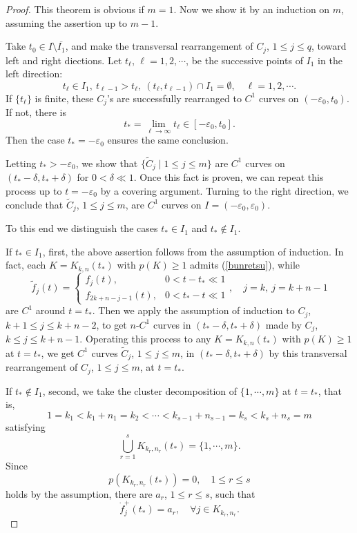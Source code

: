 \documentclass[final,a4paper]{jmsj}
\theoremstyle{thmstyleone}%
\theoremstyle{thmstyletwo}%
\theoremstyle{thmstylethree}%
\begin{document}
\begin{proof} 
This theorem is obvious if $m=1$. Now we show it by an induction on $m$, assuming the assertion up to $m-1$. 

Take $t_0\in I\setminus \overline{I_1}$, and make the transversal rearrangement of $C_j$, $1\leq j\leq q$, toward left and right diections.  Let $t_\ell$, $\ell=1,2,\cdots$, be the successive points of $I_1$ in the left direction: 
\[ t_\ell \in I_1, \ t_{\ell-1}>t_\ell, \ (t_\ell, t_{\ell-1})\cap I_1=\emptyset, \quad \ell=1,2,\cdots. \] 
If $\{ t_\ell \}$ is finite, these $C_j$'s are successfully rearranged to $C^1$ curves on $(-\varepsilon_0, t_0)$. If not, there is 
\[ t_\ast=\lim_{\ell\rightarrow \infty}t_\ell \in [-\varepsilon_0, t_0]. \] 
Then the case $t_\ast=-\varepsilon_0$ ensures the same conclusion. 

Letting $t_\ast>-\varepsilon_0$, we show that $\{ \tilde C_j\mid 1\leq j\leq m\}$ are $C^1$ curves on $(t_\ast-\delta, t_\ast+\delta)$ for $0<\delta \ll 1$.  Once this fact is proven, we can repeat this process up to $t=-\varepsilon_0$ by a covering argument. Turning to the right direction, we conclude that $\tilde C_j$, $1\leq j\leq m$, are $C^1$ curves on $I=(-\varepsilon_0, \varepsilon_0)$.  

To this end we distinguish the cases $t_\ast\in I_1$ and $t_\ast \not\in I_1$. 

If $t_\ast \in I_1$, first, the above  assertion follows from the assumption of induction. In fact, each $K=K_{k,n}(t_\ast)$ with $p(K)\geq 1$ admits (\ref{bunretsu}), while 
\[ \tilde f_j(t)=\left\{ \begin{array}{ll} 
f_j(t), & 0<t-t_\ast\ll 1\\ 
f_{2k+n-j-1}(t), & 0<t_\ast-t\ll 1\end{array} \right.,  \quad j=k, \ j=k+n-1 \] 
are $C^1$ around $t=t_\ast$. Then we apply the assumption of induction to $C_j$, $k+1\leq j\leq k+n-2$, to get $n$-$C^1$ curves in $(t_\ast-\delta, t_\ast+\delta)$ made by $C_j$, $k\leq j\leq k+n-1$. Operating this process to any $K=K_{k,n}(t_\ast)$ with $p(K)\geq 1$ at $t=t_\ast$, we get $C^1$ curves $\tilde C_j$, $1\leq j\leq m$, in $(t_\ast-\delta, t_\ast+\delta)$ by this transversal rearrangement of $C_j$, $1\leq j\leq m$, at $t=t_\ast$.  

If $t_\ast\not \in I_1$, second, we take the cluster decomposition of $\{ 1,\cdots, m\}$ at $t=t_\ast$, that is,  
\[ 1=k_1<k_1+n_1=k_2<\cdots< k_{s-1}+n_{s-1}=k_s<k_s+n_s=m \] 
satisfying  
\[ \bigcup_{r=1}^sK_{k_r, n_r}(t_\ast)=\{ 1, \cdots, m\}. \] 
Since 
\[ p(K_{k_r, n_r}(t_\ast))=0, \quad 1\leq r\leq s \] 
holds by the assumption, there are $a_r$, $1\leq r\leq s$, such that 
\[ \dot f_j^+(t_\ast)=a_r, \quad \forall j\in K_{k_r, n_r}. \]


\end{proof}
\end{document}

